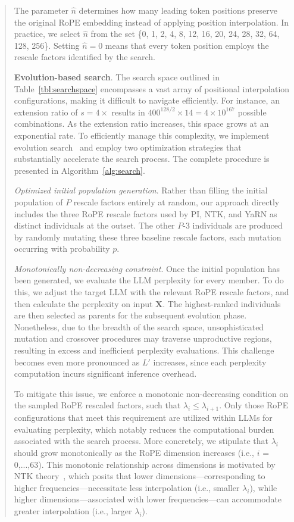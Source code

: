 \begin{abstract}
The parameter $\hat{n}$ determines how many leading token positions preserve the original RoPE embedding instead of applying position interpolation. In practice, we select $\hat{n}$ from the set \{0, 1, 2, 4, 8, 12, 16, 20, 24, 28, 32, 64, 128, 256\}. Setting $\hat{n}=0$ means that every token position employs the rescale factors identified by the search.

\textbf{Evolution-based search}. The search space outlined in Table~\ref{tbl:searchspace} encompasses a vast array of positional interpolation configurations, making it difficult to navigate efficiently. For instance, an extension ratio of $s=4\times$ results in $400^{128/2}\times14 = 4\times10^{167}$ possible combinations. As the extension ratio increases, this space grows at an exponential rate. To efficiently manage this complexity, we implement evolution search~\cite{guo2020single} and employ two optimization strategies that substantially accelerate the search process. The complete procedure is presented in Algorithm~\ref{alg:search}.

\textit{Optimized initial population generation}. Rather than filling the initial population of $P$ rescale factors entirely at random, our approach directly includes the three RoPE rescale factors used by PI, NTK, and YaRN as distinct individuals at the outset. The other $P$-3 individuals are produced by randomly mutating these three baseline rescale factors, each mutation occurring with probability $p$.

\textit{Monotonically non-decreasing constraint}. Once the initial population has been generated, we evaluate the LLM perplexity for every member. To do this, we adjust the target LLM with the relevant RoPE rescale factors, and then calculate the perplexity on input $\mathbf{X}$. The highest-ranked individuals are then selected as parents for the subsequent evolution phase. Nonetheless, due to the breadth of the search space, unsophisticated mutation and crossover procedures may traverse unproductive regions, resulting in excess and inefficient perplexity evaluations. This challenge becomes even more pronounced as $L'$ increases, since each perplexity computation incurs significant inference overhead.

To mitigate this issue, we enforce a monotonic non-decreasing condition on the sampled RoPE rescaled factors, such that $\lambda_i \leq \lambda_{i+1}$. Only those RoPE configurations that meet this requirement are utilized within LLMs for evaluating perplexity, which notably reduces the computational burden associated with the search process. More concretely, we stipulate that $\lambda_i$ should grow monotonically as the RoPE dimension increases (i.e., $i$ = 0,...,63). This monotonic relationship across dimensions is motivated by NTK theory~\cite{jacot2018neural,tancik2020fourier,ntk}, which posits that lower dimensions—corresponding to higher frequencies—necessitate less interpolation (i.e., smaller $\lambda_i$), while higher dimensions—associated with lower frequencies—can accommodate greater interpolation (i.e., larger $\lambda_i$).


\end{abstract}
